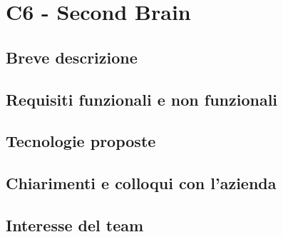 \documentclass[a4paper,11pt]{article}
\begin{document}
\section{C6 - Second Brain}
\subsection{Breve descrizione}
\subsection{Requisiti funzionali e non funzionali}
\subsection{Tecnologie proposte}
\subsection{Chiarimenti e colloqui con l'azienda}
\subsection{Interesse del team}
\end{document}
